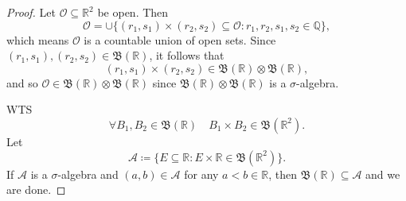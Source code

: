 \documentclass[notoc,notitlepage]{tufte-book}
\begin{document}
\begin{proof}
  Let $\mathcal{O} \subseteq \mathbb{R}^2$ be open.
  Then
  \begin{equation*}
    \mathcal{O} = \cup \{ (r_1, s_1) \times (r_2, s_2) \subseteq \mathcal{O}
          : r_1, r_2, s_1, s_2 \in \mathbb{Q} \},
  \end{equation*}
  which means $\mathcal{O}$ is a countable union of open sets.
  Since $(r_1, s_1), (r_2, s_2) \in \mathfrak{B}(\mathbb{R})$, it follows that
  \begin{equation*}
    (r_1, s_1) \times (r_2, s_2)
      \in \mathfrak{B}(\mathbb{R}) \otimes \mathfrak{B}(\mathbb{R}),
  \end{equation*}
  and so $\mathcal{O} \in \mathfrak{B}(\mathbb{R}) \otimes \mathfrak{B}(\mathbb{R})$
  since $\mathfrak{B}(\mathbb{R}) \otimes \mathfrak{B}(\mathbb{R})$ is a
  $\sigma$-algebra.

  \noindent
  WTS
  \begin{equation*}
    \forall B_1, B_2 \in \mathfrak{B}(\mathbb{R})\quad
      B_1 \times B_2 \in \mathfrak{B}(\mathbb{R}^2).
  \end{equation*}
  Let
  \begin{equation*}
    \mathcal{A} \coloneqq \{ E \subseteq \mathbb{R}
      : E \times \mathbb{R} \in \mathfrak{B}(\mathbb{R}^2) \}.
  \end{equation*}
  If $\mathcal{A}$ is a $\sigma$-algebra and $(a, b) \in \mathcal{A}$
  for any $a < b \in \mathbb{R}$,
  then $\mathfrak{B}(\mathbb{R}) \subseteq \mathcal{A}$ and we are done.


\end{proof}
\end{document}
